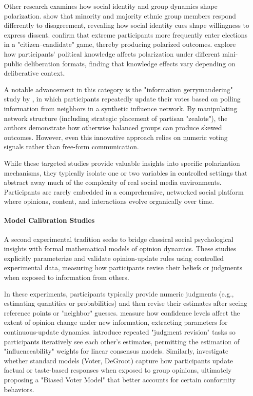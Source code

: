 Other research examines how social identity and group dynamics shape polarization. \citep{wuestenenk_influence_2023} show that minority and majority ethnic group members respond differently to disagreement, revealing how social identity cues shape willingness to express dissent. \citep{groser_candidate_2019} confirm that extreme participants more frequently enter elections in a "citizen–candidate" game, thereby producing polarized outcomes. \citep{herne_influence_2019} explore how participants' political knowledge affects polarization under different mini-public deliberation formats, finding that knowledge effects vary depending on deliberative context.

A notable advancement in this category is the "information gerrymandering" study by \citep{stewart_information_2019}, in which participants repeatedly update their votes based on polling information from neighbors in a synthetic influence network. By manipulating network structure (including strategic placement of partisan "zealots"), the authors demonstrate how otherwise balanced groups can produce skewed outcomes. However, even this innovative approach relies on numeric voting signals rather than free-form communication.

While these targeted studies provide valuable insights into specific polarization mechanisms, they typically isolate one or two variables in controlled settings that abstract away much of the complexity of real social media environments. Participants are rarely embedded in a comprehensive, networked social platform where opinions, content, and interactions evolve organically over time.

\paragraph{Model Calibration Studies}
A second experimental tradition seeks to bridge classical social psychological insights with formal mathematical models of opinion dynamics. These studies explicitly parameterize and validate opinion-update rules using controlled experimental data, measuring how participants revise their beliefs or judgments when exposed to information from others.

In these experiments, participants typically provide numeric judgments (e.g., estimating quantities or probabilities) and then revise their estimates after seeing reference points or "neighbor" guesses. \citep{chacoma_opinion_2015} measure how confidence levels affect the extent of opinion change under new information, extracting parameters for continuous-update dynamics. \citep{vande_kerckhove_modelling_2016} introduce repeated "judgment revision" tasks so participants iteratively see each other's estimates, permitting the estimation of "influenceability" weights for linear consensus models. Similarly, \citep{das_modeling_2014} investigate whether standard models (Voter, DeGroot) capture how participants update factual or taste-based responses when exposed to group opinions, ultimately proposing a "Biased Voter Model" that better accounts for certain conformity behaviors.

